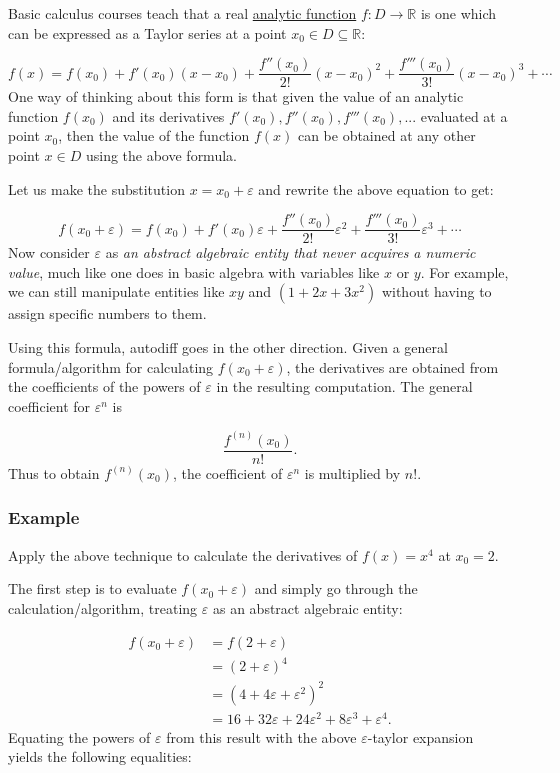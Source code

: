 \documentclass{article}
\begin{document}
Basic calculus courses teach that a real \href{https://en.wikipedia.org/wiki/Analytic_function}{analytic function}
$f : D\rightarrow\mathbb{R}$ is one which can be expressed as a Taylor series at a point
$x_0\in D\subseteq\mathbb{R}$:

\[
f(x) = f(x_0) + f'(x_0)(x-x_0) + \frac{f''(x_0)}{2!}(x-x_0)^2 + \frac{f'''(x_0)}{3!}(x-x_0)^3 + \cdots
\]
One way of thinking about this form is that given the value of an analytic function $f(x_0)$ and its derivatives
$f'(x_0), f''(x_0), f'''(x_0), ...$ evaluated at a point $x_0$, then the value of the function
$f(x)$ can be obtained at any other point $x\in D$ using the above formula.

Let us make the substitution $x=x_0+\varepsilon$ and rewrite the above equation to get:

\[
f(x_0+\varepsilon) = f(x_0) + f'(x_0)\varepsilon + \frac{f''(x_0)}{2!}\varepsilon^2 + \frac{f'''(x_0)}{3!}\varepsilon^3 + \cdots
\]
Now consider $\varepsilon$ as {\it an abstract algebraic entity that never acquires a numeric value}, much like
one does in basic algebra with variables like $x$ or $y$. For example, we can still manipulate entities
like $xy$ and $(1+2x+3x^2)$ without having to assign specific numbers to them.

Using this formula, autodiff goes in the other direction. Given a general formula/algorithm for calculating
$f(x_0+\varepsilon)$, the derivatives are obtained from the coefficients of the powers of $\varepsilon$
in the resulting computation. The general coefficient for $\varepsilon^n$ is

\[\frac{f^{(n)}(x_0)}{n!}.\]
Thus to obtain $f^{(n)}(x_0)$, the coefficient of $\varepsilon^n$ is multiplied by $n!$.

\subsubsection{Example}

Apply the above technique to calculate the derivatives of $f(x)=x^4$ at $x_0=2$.

The first step is to evaluate $f(x_0+\varepsilon)$ and simply go through the calculation/algorithm, treating
$\varepsilon$ as an abstract algebraic entity:

\begin{align*}
f(x_0+\varepsilon) &= f(2+\varepsilon) \\
 &= (2+\varepsilon)^4 \\
 &= \left(4+4\varepsilon+\varepsilon^2\right)^2 \\
 &= 16+32\varepsilon+24\varepsilon^2+8\varepsilon^3+\varepsilon^4.
\end{align*}
Equating the powers of $\varepsilon$ from this result with the above $\varepsilon$-taylor expansion
yields the following equalities:
\end{document}
